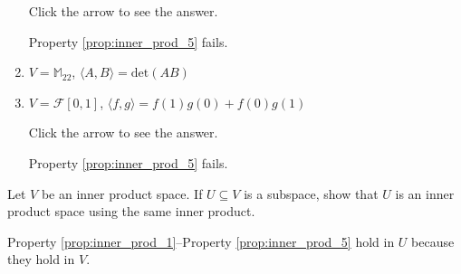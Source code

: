 \documentclass{ximera}
\begin{document}
\begin{problem}
\begin{enumerate}
Click the arrow to see the answer.
\begin{expandable}{}{}
Property \ref{prop:inner_prod_5} fails.
\end{expandable}

\item $V = \mathbb{M}_{22}$, $\langle A, B \rangle = \mbox{det}(AB)$

\item $V = \mathcal{F}[0, 1]$, $\langle f, g \rangle = f(1)g(0) + f(0)g(1)$

Click the arrow to see the answer.
\begin{expandable}{}{}
Property \ref{prop:inner_prod_5} fails.
\end{expandable}

\end{enumerate}
\end{problem}

\begin{problem}\label{prob:inner_prod_2}
Let $V$ be an inner product space. If $U \subseteq V$ is a subspace, show that $U$ is an inner product space using the same inner product.

\begin{hint}
 Property \ref{prop:inner_prod_1}--Property \ref{prop:inner_prod_5} hold in $U$ because they hold in $V$.
\end{hint}
\end{problem}
\end{document}
